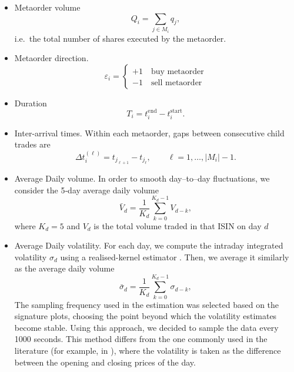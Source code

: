 \documentclass[11pt]{article}
\begin{document}
\begin{itemize}
  \item Metaorder volume
        \begin{equation}
          Q_i = \sum_{j\in M_i} q_j,
        \end{equation}
        i.e.\ the total number of shares executed by the metaorder.

  \item Metaorder direction.
        \begin{equation}
            \varepsilon_i = \begin{cases}
                +1 \quad \text{buy metaorder} \\ -1 \quad \text{sell metaorder}
            \end{cases}
        \end{equation}
  \item Duration
        \begin{equation}
          T_i = t_i^{\text{end}} - t_i^{\text{start}}.
        \end{equation}

  \item Inter-arrival times. Within each metaorder, gaps between
        consecutive child trades are
        \begin{equation}
          \Delta t_i^{(\ell)} = t_{j_{\ell+1}} - t_{j_\ell}, \qquad \ell = 1,\dots, |M_i|-1.
        \end{equation}

\item Average Daily volume.
      In order to smooth day–to–day fluctuations, we consider
      the 5‑day average daily volume
      \begin{equation}
        \bar V_d = \frac{1}{K_d} \sum_{k=0}^{K_d-1} V_{d-k},
      \end{equation}
      where $K_d = 5$  and $V_d$ is the total volume traded in that ISIN on day $d$


  \item Average Daily volatility. For each day, we compute the intraday integrated volatility $\sigma_d$ using a realised-kernel estimator \cite{BarndorffNielsen2008}. Then, we average it similarly as the average daily volume
  \begin{equation}
        \bar{\sigma}_d = \frac{1}{K_d} \sum_{k=0}^{K_d-1} \sigma_{d-k},
  \end{equation}
  The sampling frequency used in the estimation was selected based on the signature plots, choosing the point beyond which the volatility estimates become stable. Using this approach, we decided to sample the data every 1000 seconds. This method differs from the one commonly used in the literature (for example, in \cite{SatoKanazawa2024}), where the volatility is taken as the difference between the opening and closing prices of the day.


\end{itemize}
\end{document}
